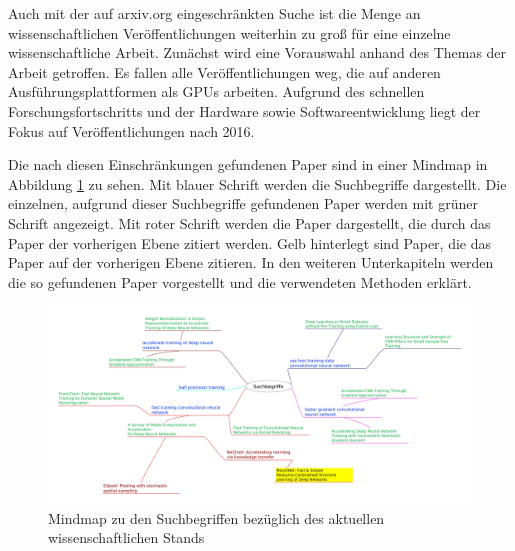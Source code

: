 Auch mit der auf arxiv.org eingeschränkten Suche ist die Menge an wissenschaftlichen Veröffentlichungen weiterhin zu groß für eine einzelne wissenschaftliche Arbeit. Zunächst wird eine Vorauswahl anhand des Themas der Arbeit getroffen. Es fallen alle Veröffentlichungen weg, die auf anderen Ausführungsplattformen als GPUs arbeiten. Aufgrund des schnellen Forschungsfortschritts und der Hardware sowie Softwareentwicklung liegt der Fokus auf Veröffentlichungen nach 2016.

Die nach diesen Einschränkungen gefundenen Paper sind in einer Mindmap in Abbildung \ref{abb:mindmap} zu sehen. Mit blauer Schrift werden die Suchbegriffe dargestellt. Die einzelnen, aufgrund dieser Suchbegriffe gefundenen Paper werden mit grüner Schrift angezeigt. Mit roter Schrift werden die Paper dargestellt, die durch das Paper der vorherigen Ebene zitiert werden. Gelb hinterlegt sind Paper, die das Paper auf der vorherigen Ebene zitieren. In den weiteren Unterkapiteln werden die so gefundenen Paper vorgestellt und die verwendeten Methoden erklärt. 

\begin{figure}[h]
 \centering
 \includegraphics[width=1\textwidth]{KapitelPartA/images/mindmap.jpg}
 \caption{Mindmap zu den Suchbegriffen bezüglich des aktuellen wissenschaftlichen Stands}
 \label{abb:mindmap}
\end{figure}


